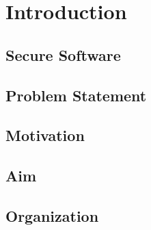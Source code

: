 \chapter{Introduction}

 
\section{Secure Software}
 
\section{Problem Statement}

 
\section{Motivation}
 

\section{Aim}
 
\section{Organization}
 